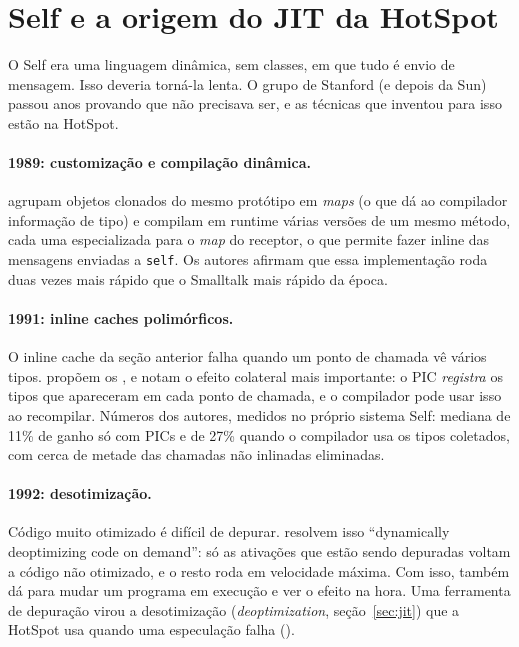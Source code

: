 \section{Self e a origem do JIT da HotSpot}
\label{sec:hist-self}

O Self era uma linguagem dinâmica, sem classes, em que tudo é envio de
mensagem. Isso deveria torná-la lenta. O grupo de Stanford (e depois da
Sun) passou anos provando que não precisava ser, e as técnicas que
inventou para isso estão na HotSpot.

\paragraph{1989: customização e compilação dinâmica.}
\textcite{paper:self-efficient-impl} agrupam objetos clonados do mesmo
protótipo em \emph{maps} (o que dá ao compilador informação de tipo) e
compilam em runtime várias versões de um mesmo método, cada uma
especializada para o \emph{map} do receptor, o que permite fazer inline
das mensagens enviadas a \texttt{self}. Os autores afirmam que essa
implementação roda duas vezes mais rápido que o Smalltalk mais rápido da
época.

\paragraph{1991: inline caches polimórficos.}
O inline cache da seção anterior falha quando um ponto de chamada vê
vários tipos. \textcite{paper:self-pics} propõem os
, e notam o
efeito colateral mais importante: o PIC \emph{registra} os tipos que
apareceram em cada ponto de chamada, e o compilador pode usar isso ao
recompilar. Números dos autores, medidos no próprio sistema Self: mediana
de 11\% de ganho só com PICs e de 27\% quando o compilador usa os tipos
coletados, com cerca de metade das chamadas não inlinadas eliminadas.

\paragraph{1992: desotimização.}
Código muito otimizado é difícil de depurar.
\textcite{paper:self-deoptimization} resolvem isso
\enquote{dynamically deoptimizing code on demand}: só as ativações que
estão sendo depuradas voltam a código não otimizado, e o resto roda em
velocidade máxima. Com isso, também dá para mudar um programa em
execução e ver o efeito na hora. Uma ferramenta de depuração virou a
desotimização (\emph{deoptimization}, seção~\ref{sec:jit}) que a
HotSpot usa quando uma especulação falha
().


